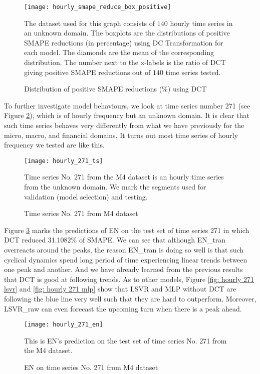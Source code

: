 \begin{figure}[H]
    \centering
    \texttt{[image: hourly\_smape\_reduce\_box\_positive]}
    \caption{Distribution of positive SMAPE reductions (\%) using DCT}
    {\raggedright \footnotesize The dataset used for this graph consists of $140$ hourly time series in an unknown domain. The boxplots are the distributions of positive SMAPE reductions (in percentage) using DC Transformation for each model. The diamonds are the mean of the corresponding distribution. The number next to the x-labels is the ratio of DCT giving positive SMAPE reductions out of $140$ time series tested.\par}
    \label{fig: hourly positive smape reduce box}
\end{figure}

To further investigate model behaviours, we look at time series number 271 (see Figure \ref{fig: hourly 271 ts}), which is of hourly frequency but an unknown domain. It is clear that such time series behaves very differently from what we have previously for the micro, macro, and financial domains. It turns out most time series of hourly frequency we tested are like this.
\begin{figure}[H]
    \centering
    \texttt{[image: hourly\_271\_ts]}
    \caption{Time series No. 271 from M4 dataset}
    {\raggedright \footnotesize Time series No. 271 from the M4 dataset is an hourly time series from the unknown domain. We mark the segments used for validation (model selection) and testing.\par}
    \label{fig: hourly 271 ts}
\end{figure}
Figure \ref{fig: hourly 271 en} marks the predictions of EN on the test set of time series 271 in which DCT reduced 31.1082\% of SMAPE. We can see that although EN\_tran overreacts around the peaks, the reason EN\_tran is doing so well is that such cyclical dynamics spend long period of time experiencing linear trends between one peak and another. And we have already learned from the previous results that DCT is good at following trends. As to other models, Figure \ref{fig: hourly 271 lsvr} and \ref{fig: hourly 271 mlp} show that LSVR and MLP without DCT are following the blue line very well such that they are hard to outperform. Moreover, LSVR\_raw can even forecast the upcoming turn when there is a peak ahead.
\begin{figure}[H]
    \centering
    \texttt{[image: hourly\_271\_en]}
    \caption{EN on time series No. 271 from M4 dataset}
    {\raggedright \footnotesize This is EN's prediction on the test set of time series No. 271 from the M4 dataset.  \par}
    \label{fig: hourly 271 en}
\end{figure}
